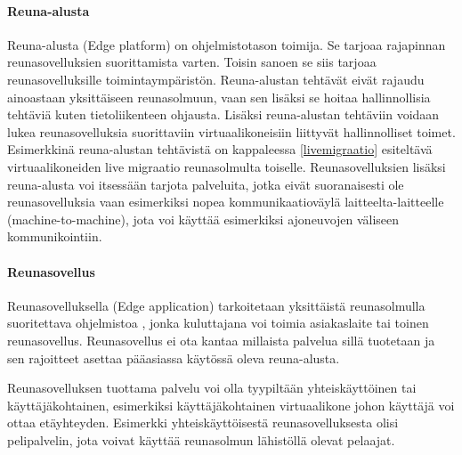 \paragraph{Reuna-alusta}
Reuna-alusta (Edge platform) on ohjelmistotason toimija. Se tarjoaa rajapinnan reunasovelluksien suorittamista varten\cite{etsirefarch}. Toisin sanoen se siis tarjoaa reunasovelluksille toimintaympäristön.
Reuna-alustan tehtävät eivät rajaudu ainoastaan yksittäiseen reunasolmuun, vaan sen lisäksi se hoitaa hallinnollisia tehtäviä kuten tietoliikenteen ohjausta. Lisäksi reuna-alustan tehtäviin voidaan lukea reunasovelluksia suorittaviin virtuaalikoneisiin liittyvät hallinnolliset toimet. Esimerkkinä reuna-alustan tehtävistä on kappaleessa \ref{livemigraatio} esiteltävä virtuaalikoneiden live migraatio reunasolmulta toiselle.
Reunasovelluksien lisäksi reuna-alusta voi itsessään tarjota palveluita, jotka eivät suoranaisesti ole reunasovelluksia vaan esimerkiksi nopea kommunikaatioväylä laitteelta-laitteelle (machine-to-machine), jota voi käyttää esimerkiksi ajoneuvojen väliseen kommunikointiin.

\paragraph{Reunasovellus}
Reunasovelluksella (Edge application) tarkoitetaan yksittäistä reunasolmulla suoritettava ohjelmistoa \cite{etsirefarch}, jonka kuluttajana voi toimia asiakaslaite tai toinen reunasovellus. Reunasovellus ei ota kantaa millaista palvelua sillä tuotetaan ja sen rajoitteet asettaa pääasiassa käytössä oleva reuna-alusta. 

Reunasovelluksen tuottama palvelu voi olla tyypiltään yhteiskäyttöinen tai käyttäjäkohtainen, esimerkiksi käyttäjäkohtainen virtuaalikone johon käyttäjä voi ottaa etäyhteyden. Esimerkki yhteiskäyttöisestä reunasovelluksesta olisi pelipalvelin, jota voivat käyttää reunasolmun lähistöllä olevat pelaajat. 

